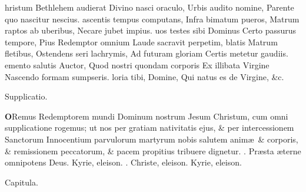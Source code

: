 \documentclass[letter,11pt]{book}
\makeatletter
\DeclareRobustCommand{\Rbar}{\vers@resp{0pt}{R}}
\newcommand{\vers@resp@sym}{\raisebox{0.2ex}{\rotatebox[origin=c]{-20}{$\m@th\rceil$}}}
\newcommand{\vers@resp}[2]{%
  {\ooalign{\hidewidth\kern#1\vers@resp@sym\hidewidth\cr#2\cr}}%
}%
\def\R{\color{Red} \Rbar . \color{black}}
\makeatother
\begin{document}
\begin{multicols*}{2}
hristum Bethlehem audierat
\newline \indent Divino nasci oraculo,
\newline \indent Urbis audito nomine,
\newline \indent Parente quo nascitur nescius.
ascentis tempus computans,
\newline \indent Infra bimatum pueros,
\newline \indent Matrum raptos ab uberibus,
\newline \indent Necare jubet impius.
uos testes sibi Dominus
\newline \indent Certo passurus tempore,
\newline \indent Pius Redemptor omnium
\newline \indent Laude sacravit perpetim,
blatis Matrum fletibus,
\newline \indent Ostendens seri lachrymis,
\newline \indent Ad futuram gloriam
\newline \indent Certis metetur gaudiis.
emento salutis Auctor,
\newline \indent Quod nostri quondam corporis
\newline \indent Ex illibata Virgine
\newline \indent Nascendo formam sumpseris.
loria tibi, Domine,
\newline \indent Qui natus es de Virgine, \&c.
\vspace{-.5em} \begin{center} \color{Red} Supplicatio. \color{black} \end{center} \vspace{-.5em}
\lettrine[lines=2]{\bfseries \color{Red} O}{}Remus Redemptorem mundi Dominum nostrum Jesum Christum, cum omni supplicatione rogemus; ut nos per gratiam nativitatis ejus, \& per intercessionem Sanctorum Innocentium parvulorum martyrum nobis salutem anim\ae \ \& corporis, \& remissionem peccatorum, \& pacem propitius tribuere dignetur. \R Pr\ae sta \ae terne omnipotens Deus. Kyrie, eleison. \R Christe, eleison. Kyrie, eleison.
\vspace{-.5em} \begin{center} \color{Red} Capitula. \color{black} \end{center} \vspace{-.5em}

\end{multicols*}
\end{document}
